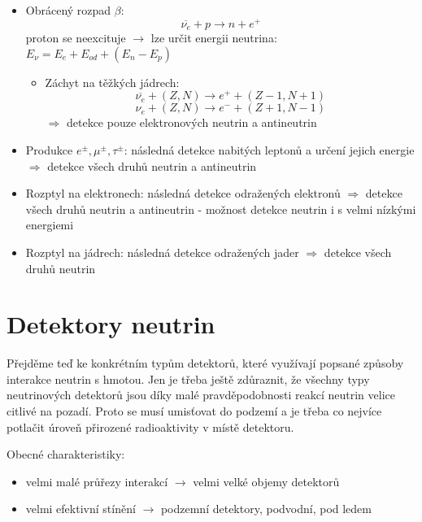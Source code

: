 \documentclass[../../main.tex]{subfiles}
\begin{document}
\begin{itemize}
	\item Obrácený rozpad $\beta$:
	\begin{equation}
	\overline{\nu _e} + p \rightarrow n + e^+
	\end{equation}
	proton se neexcituje $\rightarrow$ lze určit energii neutrina: $E_{\nu} = E_e + E_{od} + (E_n - E_p)$
	\begin{itemize}
		\item Záchyt na těžkých jádrech: 
		\begin{equation}
		\overline{\nu _e} + (Z,N) \rightarrow e^+ + (Z-1,N+1)
		\end{equation}
		\begin{equation}
		\nu_e + (Z,N) \rightarrow e^- + (Z+1,N-1)
		\end{equation}
		$\Rightarrow$ detekce pouze elektronových neutrin a antineutrin
	\end{itemize}
	\item Produkce $e^{\pm}, \mu^{\pm}, \tau^{\pm}$: následná detekce nabitých leptonů a určení jejich energie $\Rightarrow$ detekce všech druhů neutrin a antineutrin
	\item Rozptyl na elektronech: následná detekce odražených elektronů $\Rightarrow$ detekce všech druhů neutrin a antineutrin - možnost detekce neutrin i s velmi nízkými energiemi
	\item Rozptyl na jádrech: následná detekce odražených jader $\Rightarrow$ detekce všech druhů neutrin
\end{itemize}
	

\section{Detektory neutrin}

Přejděme teď ke konkrétním typům detektorů, které využívají popsané způsoby interakce neutrin s hmotou. Jen je třeba ještě zdůraznit, že všechny typy neutrinových detektorů jsou díky malé pravděpodobnosti reakcí neutrin velice citlivé na pozadí. Proto se musí umisťovat do podzemí a je třeba co nejvíce potlačit úroveň přirozené radioaktivity v místě detektoru.

Obecné charakteristiky:
\begin{itemize}
	\item velmi malé průřezy interakcí  $\rightarrow$ velmi velké objemy detektorů
	\item velmi efektivní stínění $\rightarrow$ podzemní detektory, podvodní, pod ledem 
\end{itemize}
\end{document}

